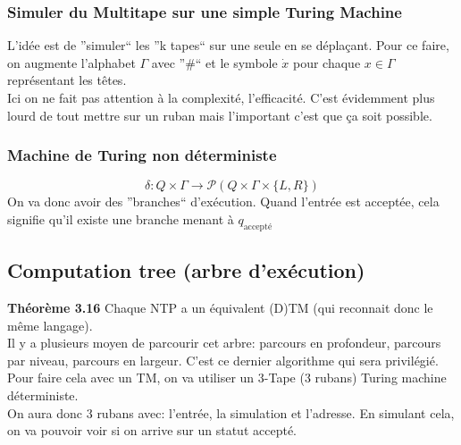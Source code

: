 \documentclass[a4paper,12pt]{article}
\begin{document}
    \subsubsection{Simuler du Multitape sur une simple Turing Machine}
      L'idée est de ''simuler`` les ''k tapes`` sur une seule en se déplaçant. Pour ce faire, on augmente l'alphabet $\Gamma$ avec ''\#`` et le symbole $\dot{x}$ pour chaque $x \in \Gamma$ représentant les têtes.\\
      Ici on ne fait pas attention à la complexité, l'efficacité.  C'est évidemment plus lourd de tout mettre sur un ruban mais l'important c'est que ça soit possible.

    \subsubsection{Machine de Turing non déterministe}
      $$\delta : Q \times \Gamma \rightarrow \mathcal P (Q \times \Gamma \times \{L, R\})$$
      On va donc avoir des ''branches`` d’exécution.  Quand l'entrée est acceptée, cela signifie qu'il existe une branche menant à $q_{\text{accepté}}$

  \subsection{Computation tree (arbre d'exécution)}
    \textbf{Théorème 3.16} Chaque NTP a un équivalent (D)TM (qui reconnait donc le même langage).\\
    Il y a plusieurs moyen de parcourir cet arbre: parcours en profondeur, parcours par niveau, parcours en largeur.  C'est ce dernier algorithme qui sera privilégié.  Pour faire cela avec un TM, on va utiliser un 3-Tape (3 rubans) Turing machine déterministe.\\
    On aura donc 3 rubans avec: l'entrée, la simulation et l'adresse.  En simulant cela, on va pouvoir voir si on arrive sur un statut accepté.
\end{document}
